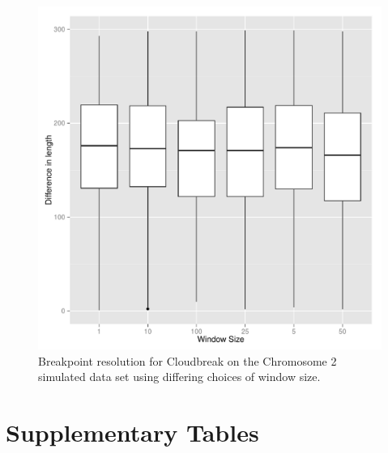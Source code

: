 \documentclass[11pt]{article}
\begin{document}
\begin{figure}
\centering
\includegraphics[width=.8\textwidth]{../../figures/breakpoint_resolution_by_windowSize.pdf}
\caption[Cloudbreak breakpoint resolution with varying window sizes.]{Breakpoint resolution for Cloudbreak on the Chromosome 2 simulated data set using differing choices of window size.}
\label{breakpoint_resolution_by_windowSize}
\end{figure}

\clearpage

\section{Supplementary Tables}
\end{document}
